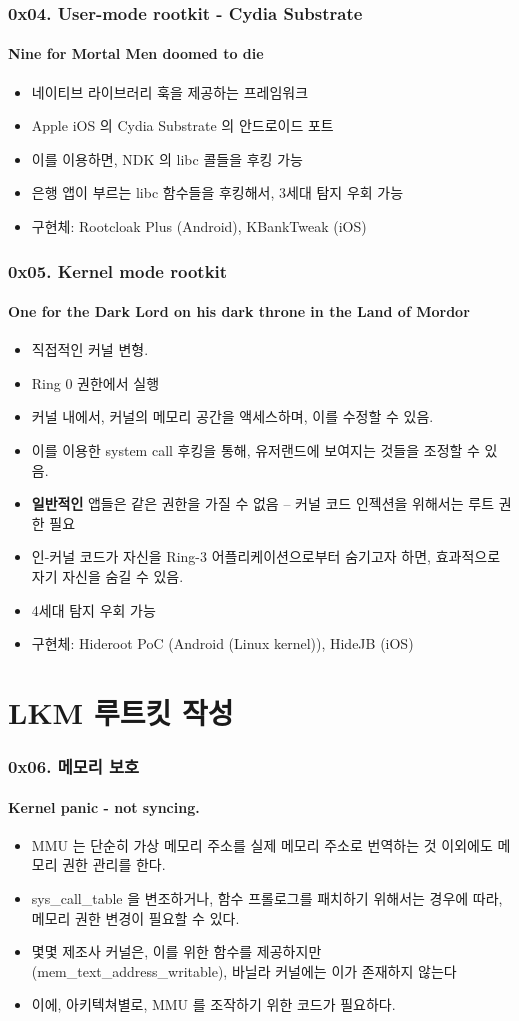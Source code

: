 \begin{frame}
  \frametitle{0x04. User-mode rootkit - Cydia Substrate}
  \framesubtitle{Nine for Mortal Men doomed to die}

  \begin{itemize}
  \item 네이티브 라이브러리 훅을 제공하는 프레임워크
  \item Apple iOS 의 Cydia Substrate 의 안드로이드 포트
  \item 이를 이용하면, NDK 의 libc 콜들을 후킹 가능
  \item 은행 앱이 부르는 libc 함수들을 후킹해서, 3세대 탐지 우회 가능
  \item 구현체: Rootcloak Plus (Android), KBankTweak (iOS)
  \end{itemize}
\end{frame}

\begin{frame}
  \frametitle{0x05. Kernel mode rootkit}
  \framesubtitle{One for the Dark Lord on his dark throne in the Land of Mordor}

  \begin{itemize}
  \item 직접적인 커널 변형.
  \item Ring 0 권한에서 실행
  \item 커널 내에서, 커널의 메모리 공간을 액세스하며, 이를 수정할 수 있음.
  \item 이를 이용한 system call 후킹을 통해, 유저랜드에 보여지는 것들을 조정할 수 있음.
  \item \textbf{일반적인} 앱들은 같은 권한을 가질 수 없음 -- 커널 코드 인젝션을 위해서는 루트 권한 필요
  \item 인-커널 코드가 자신을 Ring-3 어플리케이션으로부터 숨기고자 하면, 효과적으로 자기 자신을 숨길 수 있음.
  \item 4세대 탐지 우회 가능
  \item 구현체: Hideroot PoC (Android (Linux kernel)), HideJB (iOS)
  \end{itemize}
\end{frame}

\section[Section]{LKM 루트킷 작성}
\begin{frame}
  \frametitle{0x06. 메모리 보호}
  \framesubtitle{Kernel panic - not syncing.}

  \begin{itemize}
  \item MMU 는 단순히 가상 메모리 주소를 실제 메모리 주소로 번역하는 것 이외에도 메모리 권한 관리를 한다.
  \item sys\_call\_table 을 변조하거나, 함수 프롤로그를 패치하기 위해서는 경우에 따라, 메모리 권한 변경이 필요할 수 있다.
  \item 몇몇 제조사 커널은, 이를 위한 함수를 제공하지만 (mem\_text\_address\_writable), 바닐라 커널에는 이가 존재하지 않는다
  \item 이에, 아키텍쳐별로, MMU 를 조작하기 위한 코드가 필요하다.
  \end{itemize}
\end{frame}

